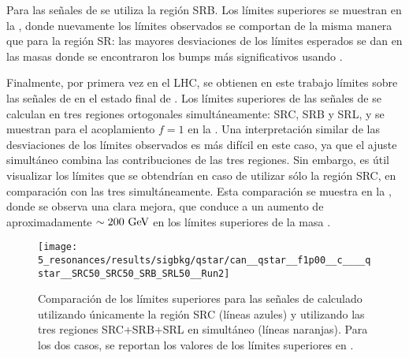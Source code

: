 Para las señales de \bstar se utiliza la región SRB. Los límites superiores se muestran en la \Fig{\ref{fig:results:results:bkgsig:results:qstar:limits:SRB}}, donde nuevamente los límites observados se comportan de la misma manera que para la región SR: las mayores desviaciones de los límites esperados se dan en las masas donde se encontraron los bumps más significativos usando \bh.

Finalmente, por primera vez en el \ac{LHC}, se obtienen en este trabajo límites sobre las señales de \cstar en el estado final de \gammajet. Los límites superiores de las señales de \cstar se calculan en tres regiones ortogonales simultáneamente: SRC, SRB y SRL, y se muestran para el acoplamiento \(f=1\) en la \Fig{\ref{fig:results:results:bkgsig:results:qstar:limits:SRC}}. Una interpretación similar de las desviaciones de los límites observados es más difícil en este caso, ya que el ajuste simultáneo combina las contribuciones de las tres regiones. Sin embargo, es útil visualizar los límites que se obtendrían en caso de utilizar sólo la región SRC, en comparación con las tres simultáneamente. Esta comparación se muestra en la \Fig{\ref{fig:results:results:bkgsig:results:qstar:limits_SRC_comparison}}, donde se observa una clara mejora, que conduce a un aumento de aproximadamente \(\sim 200~\text{GeV}\) en los límites superiores de la masa \mc.

\begin{figure}[ht!]
    \centering
    \texttt{[image: 5\_resonances/results/sigbkg/qstar/can\_\_qstar\_\_f1p00\_\_c\_\_\_\_qstar\_\_SRC50\_SRC50\_SRB\_SRL50\_\_Run2]}
    \caption{Comparación de los límites superiores para las señales de \cstar calculado utilizando únicamente la región SRC (líneas azules) y utilizando las tres regiones SRC+SRB+SRL en simultáneo (líneas naranjas). Para los dos casos, se reportan los valores de los límites superiores en \mq.}
    \label{fig:results:results:bkgsig:results:qstar:limits_SRC_comparison}
\end{figure}

